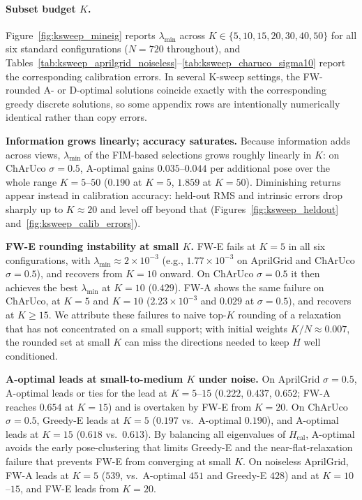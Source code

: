 \documentclass[letterpaper, 9
 pt, conference]{ieeeconf}
\begin{document}
\paragraph{Subset budget $K$.}
Figure~\ref{fig:ksweep_mineig} reports $\lambda_{\min}$ across
$K\in\{5,10,15,20,30,40,50\}$ for all six standard configurations
($N{=}720$ throughout), and
Tables~\ref{tab:ksweep_aprilgrid_noiseless}--\ref{tab:ksweep_charuco_sigma10}
report the corresponding calibration errors.
In several K-sweep settings, the FW-rounded A- or D-optimal solutions coincide
exactly with the corresponding greedy discrete solutions, so some appendix rows
are intentionally numerically identical rather than copy errors.

\noindent\textbf{Information grows linearly; accuracy saturates.}
Because information adds across views, $\lambda_{\min}$ of the FIM-based
selections grows roughly linearly in $K$: on ChArUco $\sigma{=}0.5$,
A-optimal gains $0.035$--$0.044$ per additional pose over the whole range
$K{=}5$--$50$ ($0.190$ at $K{=}5$, $1.859$ at $K{=}50$).
Diminishing returns appear instead in calibration accuracy: held-out RMS and
intrinsic errors drop sharply up to $K{\approx}20$ and level off beyond that
(Figures~\ref{fig:ksweep_heldout} and~\ref{fig:ksweep_calib_errors}).

\noindent\textbf{FW-E rounding instability at small $K$.}
FW-E fails at $K{=}5$ in all six configurations, with
$\lambda_{\min}{\approx}2\!\times\!10^{-3}$ (e.g., $1.77\!\times\!10^{-3}$ on
AprilGrid and ChArUco $\sigma{=}0.5$), and recovers from $K{=}10$ onward.
On ChArUco $\sigma{=}0.5$ it then achieves the best $\lambda_{\min}$ at
$K{=}10$ ($0.429$).
FW-A shows the same failure on ChArUco, at $K{=}5$ and $K{=}10$
($2.23\!\times\!10^{-3}$ and $0.029$ at $\sigma{=}0.5$), and recovers at $K{\ge}15$.
We attribute these failures to naive top-$K$ rounding of a relaxation that has
not concentrated on a small support; with initial weights $K/N{\approx}0.007$,
the rounded set at small $K$ can miss the directions needed to keep $H$ well
conditioned.

\noindent\textbf{A-optimal leads at small-to-medium $K$ under noise.}
On AprilGrid $\sigma{=}0.5$, A-optimal leads or ties for the lead at
$K{=}5$--$15$ ($0.222$, $0.437$, $0.652$; FW-A reaches $0.654$ at $K{=}15$)
and is overtaken by FW-E from $K{=}20$.
On ChArUco $\sigma{=}0.5$, Greedy-E leads at $K{=}5$ ($0.197$ vs.\
A-optimal $0.190$), and A-optimal leads at $K{=}15$ ($0.618$ vs.\ $0.613$).
By balancing all eigenvalues of $H_{\mathrm{cal}}$, A-optimal avoids the
early pose-clustering that limits Greedy-E and the near-flat-relaxation
failure that prevents FW-E from converging at small $K$.
On noiseless AprilGrid, FW-A leads at $K{=}5$ ($539$, vs.\ A-optimal $451$
and Greedy-E $428$) and at $K{=}10$--$15$, and FW-E leads from $K{=}20$.
\end{document}
